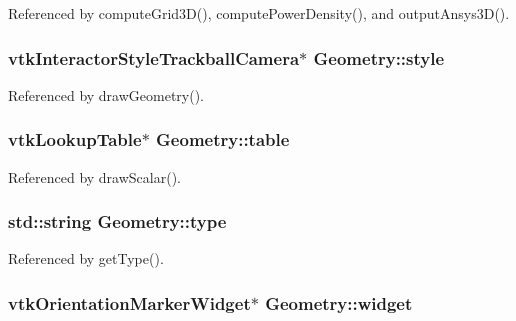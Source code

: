 Referenced by compute\-Grid3\-D(), compute\-Power\-Density(), and output\-Ansys3\-D().

\hypertarget{classGeometry_a994d1c4d7c8ce0622fcf7a96b5d234af}{
\subsubsection[{style}]{\setlength{\rightskip}{0pt plus 5cm}vtk\-Interactor\-Style\-Trackball\-Camera$\ast$ Geometry\-::style\hspace{0.3cm}{\ttfamily [protected]}}}\label{classGeometry_a994d1c4d7c8ce0622fcf7a96b5d234af}


Referenced by draw\-Geometry().

\hypertarget{classGeometry_aaabe40cbb12206d80e4376367568934b}{
\subsubsection[{table}]{\setlength{\rightskip}{0pt plus 5cm}vtk\-Lookup\-Table$\ast$ Geometry\-::table\hspace{0.3cm}{\ttfamily [protected]}}}\label{classGeometry_aaabe40cbb12206d80e4376367568934b}


Referenced by draw\-Scalar().

\hypertarget{classGeometry_a734ed6644e4e3b98f157e6707c30069a}{
\subsubsection[{type}]{\setlength{\rightskip}{0pt plus 5cm}std\-::string Geometry\-::type\hspace{0.3cm}{\ttfamily [protected]}}}\label{classGeometry_a734ed6644e4e3b98f157e6707c30069a}


Referenced by get\-Type().

\hypertarget{classGeometry_ad611799bc0eb8825c963bd6d56181d8c}{
\subsubsection[{widget}]{\setlength{\rightskip}{0pt plus 5cm}vtk\-Orientation\-Marker\-Widget$\ast$ Geometry\-::widget\hspace{0.3cm}{\ttfamily [protected]}}}\label{classGeometry_ad611799bc0eb8825c963bd6d56181d8c}


